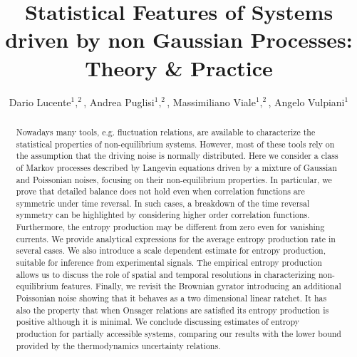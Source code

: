 \documentclass[12pt]{iopart}
\begin{document}
\title[Statistical Features of Systems driven by non Gaussian Processes]{Statistical Features of Systems driven by non Gaussian Processes: Theory \& Practice}
\author{Dario Lucente$^1,^2$, Andrea Puglisi$^1,^2$, Massimiliano Viale$^1,^2$, Angelo Vulpiani$^1$} 

\address{$^1$ Dipartimento di Fisica - Universit\`a La Sapienza - 00185 Rome, Italy}
\address{$^2$ Istituto dei Sistemi Complessi - Consiglio Nazionale delle Ricerche, 00185 Rome, Italy}
\begin{abstract}
    Nowadays many tools, e.g. fluctuation relations, are available to characterize the statistical properties of non-equilibrium systems. However, most of these tools rely on the assumption that the driving noise is normally distributed. Here we consider a class of Markov processes described by Langevin equations driven by a mixture of Gaussian and Poissonian noises, focusing on their non-equilibrium properties. In particular, we prove that detailed balance does not hold even when correlation functions  are symmetric under time reversal. In such cases, a breakdown of the time reversal symmetry can be highlighted by considering higher order correlation functions. Furthermore, the entropy production may be different from zero even for vanishing currents. We provide analytical expressions for the average entropy production rate in several cases. We also introduce a scale dependent estimate for entropy production, suitable for inference from experimental signals. The empirical entropy production allows us to discuss the role of spatial and temporal resolutions in characterizing non-equilibrium features. Finally, we revisit the Brownian gyrator introducing an additional Poissonian noise showing that it behaves as a two dimensional linear ratchet. It has also the property that when Onsager relations are satisfied its entropy production is  positive although it is minimal. We conclude discussing estimates of entropy production for partially accessible systems, comparing our results with the lower bound provided by the thermodynamics uncertainty relations. 
\end{abstract}
\end{document}
